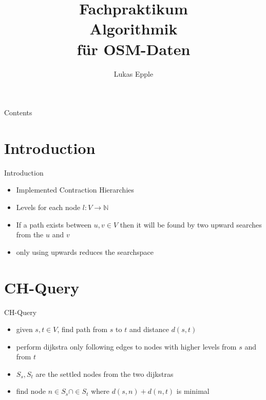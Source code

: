 \documentclass[8pt, t, aspectratio=169]{beamer}
\title{Fachpraktikum \\Algorithmik \\für OSM-Daten}
\author[Lukas Epple]{Lukas Epple}
\institute{Institut für Formale Methoden der Informatik (FMI), Universität Stuttgart}
\begin{document}
\begin{frame}[plain]
  \titlepage
\end{frame}
	    
		
\begin{frame}[plain]{Contents}
\tableofcontents
\end{frame}

\begin{huge}


\section{Introduction}
\begin{frame}{Introduction}
  \vfill
  \begin{itemize}
  \item Implemented Contraction Hierarchies
    \pause
    \item Levels for each node $l: V \rightarrow \mathbb{N}$
    \pause
    \item If a path exists between $u,v \in V$ then it will be found by two upward searches from the $u$ and $v$
    \pause
    \item only using upwards reduces the searchspace

  \end{itemize}
    
  \vfill
\end{frame}

\section{CH-Query}
\begin{frame}{CH-Query}
  \begin{itemize}
  \item given $s, t \in V$, find path from $s$ to $t$ and distance $d(s,t)$
    \pause
  \item perform dijkstra only following edges to nodes with higher levels from $s$ and from $t$
    \pause
  \item $S_s, S_t$ are the settled nodes from the two dijkstras
    \pause
  \item find node $n \in S_s \cap \in S_t$ where $d(s,n) + d(n, t)$ is minimal
  \end{itemize}
\end{frame}


\end{huge}
\end{document}

